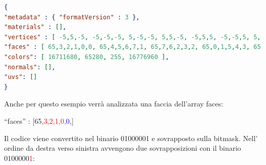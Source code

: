 \begin{lstlisting}[language=json]
{ 
"metadata" : { "formatVersion" : 3 }, 
"materials" : [], 
"vertices" : [ -5,5,-5, -5,-5,-5, 5,-5,-5, 5,5,-5, -5,5,5, -5,-5,5, 5,-5,5, 5,5,5 ], 
"faces" : [ 65,3,2,1,0,0, 65,4,5,6,7,1, 65,7,6,2,3,2, 65,0,1,5,4,3, 65,0,4,7,3,0, 65,6,5,1,2,1 ], 
"colors": [ 16711680, 65280, 255, 16776960 ], 
"normals": [], 
"uvs": [] 
}
\end{lstlisting}

Anche per questo esempio verrà analizzata una faccia dell'array faces:

``faces'' : [65,\textcolor{red}{3,2,1,0,}\textcolor{blue}{0,}]

Il codice viene convertito nel binario 01000001 e sovrapposto sulla bitmask.
Nell’ ordine da destra verso sinistra avvengono due sovrapposizioni con il binario 0\textcolor{blue}{1}00000\textcolor{red}{1}:

